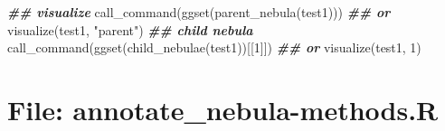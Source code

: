 \documentclass[
]{article}
\newenvironment{Shaded}{\begin{snugshade}}{\end{snugshade}}
\newcommand{\DecValTok}[1]{\textcolor[rgb]{0.00,0.00,0.81}{#1}}
\newcommand{\DocumentationTok}[1]{\textcolor[rgb]{0.56,0.35,0.01}{\textbf{\textit{#1}}}}
\newcommand{\FunctionTok}[1]{\textcolor[rgb]{0.00,0.00,0.00}{#1}}
\newcommand{\NormalTok}[1]{#1}
\newcommand{\StringTok}[1]{\textcolor[rgb]{0.31,0.60,0.02}{#1}}
\begin{document}
\begin{Shaded}
\begin{Highlighting}[]
\DocumentationTok{\#\# visualize}
\FunctionTok{call\_command}\NormalTok{(}\FunctionTok{ggset}\NormalTok{(}\FunctionTok{parent\_nebula}\NormalTok{(test1)))}
\DocumentationTok{\#\# or}
\FunctionTok{visualize}\NormalTok{(test1, }\StringTok{"parent"}\NormalTok{)}
\DocumentationTok{\#\# child nebula}
\FunctionTok{call\_command}\NormalTok{(}\FunctionTok{ggset}\NormalTok{(}\FunctionTok{child\_nebulae}\NormalTok{(test1))[[}\DecValTok{1}\NormalTok{]])}
\DocumentationTok{\#\# or}
\FunctionTok{visualize}\NormalTok{(test1, }\DecValTok{1}\NormalTok{)}
\end{Highlighting}
\end{Shaded}

\hypertarget{file-annotate_nebula-methods.r}{%
\section{File: annotate\_nebula-methods.R}\label{file-annotate_nebula-methods.r}}
\end{document}
